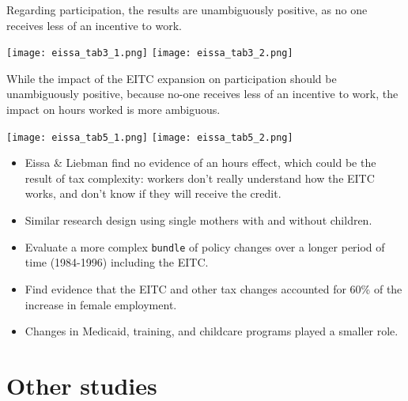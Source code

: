 \documentclass[
  letterpaper,
  DIV=11,
  numbers=noendperiod]{scrreprt}
\providecommand{\tightlist}{%
  \setlength{\itemsep}{0pt}\setlength{\parskip}{0pt}}\usepackage{longtable,booktabs,array}
\theoremstyle{definition}
\theoremstyle{remark}
\begin{document}
Regarding participation, the results are unambiguously positive, as no
one receives less of an incentive to work.

\texttt{[image: eissa\_tab3\_1.png]}
\texttt{[image: eissa\_tab3\_2.png]}

While the impact of the EITC expansion on participation should be
unambiguously positive, because no-one receives less of an incentive to
work, the impact on hours worked is more ambiguous.

\texttt{[image: eissa\_tab5\_1.png]}
\texttt{[image: eissa\_tab5\_2.png]}

\begin{itemize}
\tightlist
\item
  Eissa \& Liebman find no evidence of an hours effect, which could be
  the result of tax complexity: workers don't really understand how the
  EITC works, and don't know if they will receive the credit.
\end{itemize}

\begin{tcolorbox}[enhanced jigsaw, breakable, colframe=quarto-callout-note-color-frame, toptitle=1mm, toprule=.15mm, opacitybacktitle=0.6, opacityback=0, rightrule=.15mm, titlerule=0mm, colback=white, bottomtitle=1mm, title={Meyer \& Rosenbaum (2001)}, arc=.35mm, coltitle=black, colbacktitle=quarto-callout-note-color!10!white, leftrule=.75mm, bottomrule=.15mm, left=2mm]

\begin{itemize}
\tightlist
\item
  Similar research design using single mothers with and without
  children.
\item
  Evaluate a more complex \texttt{bundle} of policy changes over a
  longer period of time (1984-1996) including the EITC.
\item
  Find evidence that the EITC and other tax changes accounted for 60\%
  of the increase in female employment.
\item
  Changes in Medicaid, training, and childcare programs played a smaller
  role.
\end{itemize}

\end{tcolorbox}

\hypertarget{other-studies}{%
\section{Other studies}\label{other-studies}}
\end{document}
